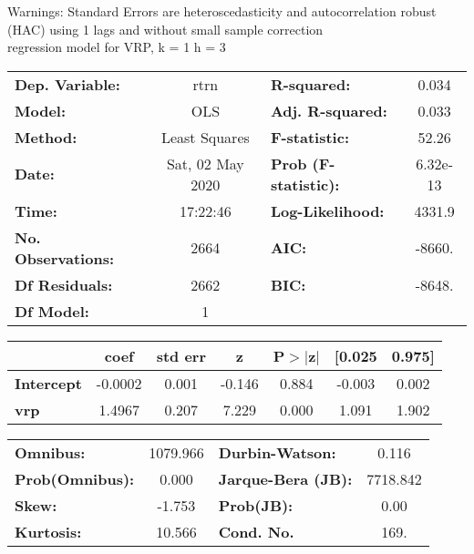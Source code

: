 Warnings: \newline
 [1] Standard Errors are heteroscedasticity and autocorrelation robust (HAC) using 1 lags and without small sample correction\\ 

regression model for VRP, k = 1 h = 3\begin{center}
\begin{tabular}{lclc}
\toprule
\textbf{Dep. Variable:}    &       rtrn       & \textbf{  R-squared:         } &     0.034   \\
\textbf{Model:}            &       OLS        & \textbf{  Adj. R-squared:    } &     0.033   \\
\textbf{Method:}           &  Least Squares   & \textbf{  F-statistic:       } &     52.26   \\
\textbf{Date:}             & Sat, 02 May 2020 & \textbf{  Prob (F-statistic):} &  6.32e-13   \\
\textbf{Time:}             &     17:22:46     & \textbf{  Log-Likelihood:    } &    4331.9   \\
\textbf{No. Observations:} &        2664      & \textbf{  AIC:               } &    -8660.   \\
\textbf{Df Residuals:}     &        2662      & \textbf{  BIC:               } &    -8648.   \\
\textbf{Df Model:}         &           1      & \textbf{                     } &             \\
\bottomrule
\end{tabular}
\begin{tabular}{lcccccc}
                   & \textbf{coef} & \textbf{std err} & \textbf{z} & \textbf{P$> |$z$|$} & \textbf{[0.025} & \textbf{0.975]}  \\
\midrule
\textbf{Intercept} &      -0.0002  &        0.001     &    -0.146  &         0.884        &       -0.003    &        0.002     \\
\textbf{vrp}       &       1.4967  &        0.207     &     7.229  &         0.000        &        1.091    &        1.902     \\
\bottomrule
\end{tabular}
\begin{tabular}{lclc}
\textbf{Omnibus:}       & 1079.966 & \textbf{  Durbin-Watson:     } &    0.116  \\
\textbf{Prob(Omnibus):} &   0.000  & \textbf{  Jarque-Bera (JB):  } & 7718.842  \\
\textbf{Skew:}          &  -1.753  & \textbf{  Prob(JB):          } &     0.00  \\
\textbf{Kurtosis:}      &  10.566  & \textbf{  Cond. No.          } &     169.  \\
\bottomrule
\end{tabular}
\end{center}

